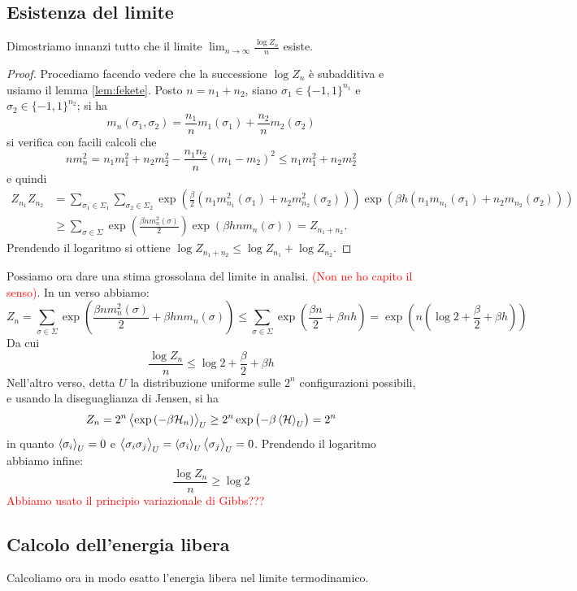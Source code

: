 \subsection{Esistenza del limite}
Dimostriamo innanzi tutto che il limite $ \lim_{n\to\infty} \frac{\log Z_n}{n} $ esiste.
\begin{proof}
    Procediamo facendo vedere che la successione $ \log Z_n $ è subadditiva e usiamo il lemma \ref{lem:fekete}.
    Posto $ n = n_1 + n_2 $, siano $ \sigma_1 \in \{-1,1\}^{n_1} $ e $ \sigma_2 \in \{-1,1\}^{n_2} $; si ha
    \[ m_n(\sigma_1,\sigma_2) = \frac{n_1}{n} m_1(\sigma_1) + \frac{n_2}{n} m_2(\sigma_2) \]
    si verifica con facili calcoli che
    \[ n m_n^2 = n_1 m_1^2 + n_2 m_2^2 - \frac{n_1 n_2}{n} (m_1-m_2)^2 \leq n_1 m_1^2 + n_2 m_2^2 \]
    e quindi
    \begin{align*}
        Z_{n_1} Z_{n_2} & = \sum_{\sigma_1\in\Sigma_1} \sum_{\sigma_2\in\Sigma_2} \exp\left(\frac{\beta}{2} \left(n_1 m_{n_1}^2(\sigma_1) + n_2 m_{n_2}^2(\sigma_2) \right) \right) \exp\left(\beta h\left(n_1 m_{n_1}(\sigma_1) + n_2 m_{n_2}(\sigma_2) \right) \right) \\
                        & \geq \sum_{\sigma\in\Sigma} \exp\left(\frac{\beta n m_n^2(\sigma)}{2} \right) \exp\left(\beta h n m_n(\sigma) \right) = Z_{n_1+n_2}.
    \end{align*}
    Prendendo il logaritmo si ottiene $ \log Z_{n_1+n_2} \leq \log Z_{n_1} + \log Z_{n_2} $.
\end{proof}

Possiamo ora dare una stima grossolana del limite in analisi. \textcolor{red}{(Non ne ho capito il senso)}. In un verso abbiamo:
\[ Z_n = \sum_{\sigma \in \Sigma} \exp\left( \frac{\beta n m_n^2(\sigma)}{2} + \beta h n m_n(\sigma) \right) \leq \sum_{\sigma \in \Sigma} \exp\left(  \frac{\beta n}{2} + \beta n h \right) = \exp\left( n \left( \log 2 + \frac{\beta}{2} + \beta h \right) \right) \]
Da cui
\[ \frac{\log Z_n}{n} \leq \log 2 + \frac{\beta}{2} + \beta h \]
Nell'altro verso, detta $ U $ la distribuzione uniforme sulle $ 2^n $ configurazioni possibili, e usando la diseguaglianza di Jensen, si ha
\[ Z_n = 2^n \left< \exp\left(-\beta\mathcal{H}_n\right) \right>_U \geq 2^n \exp\left( -\beta \left< \mathcal{H} \right>_U \right) = 2^n \]
in quanto $ \left< \sigma_i \right>_U = 0 $ e $ \left< \sigma_i\sigma_j \right>_U = \left< \sigma_i \right>_U\left< \sigma_j \right>_U = 0 $. Prendendo il logaritmo abbiamo infine:
\[ \frac{\log Z_n}{n} \geq \log 2 \]
\textcolor{red}{Abbiamo usato il principio variazionale di Gibbs???}

\subsection{Calcolo dell'energia libera}
Calcoliamo ora in modo esatto l'energia libera nel limite termodinamico.
